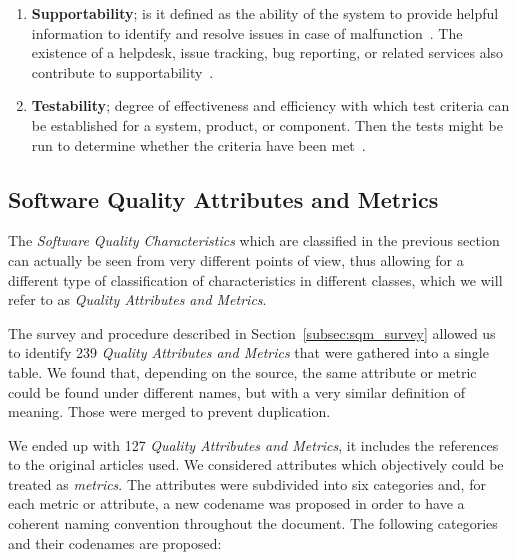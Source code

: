 \begin{enumerate}
    \item \textbf{Supportability}; is it defined as the ability of the system to provide helpful information  to identify and resolve issues in case of malfunction~\cite{microsoft_2010}. The existence of a helpdesk, issue tracking, bug reporting, or related services also contribute to supportability~\cite{orviz_fernandez_eosc-synergy_2020}.

    \item \textbf{Testability}; degree of effectiveness and efficiency with which test criteria can be established for a system, product, or component. Then the tests might be run to determine whether the criteria have been met~\cite{iso_25010_2011_2017}.
\end{enumerate}

\subsection{Software Quality Attributes and Metrics}
\label{subsec:SW_quality_attributes}

The \textit{Software Quality Characteristics} which are classified in the previous section can actually be seen from very different points of view, thus allowing for a different type of classification of characteristics in different classes, which we will refer to as \textit{Quality Attributes and Metrics}.

The survey and procedure described in Section~\ref{subsec:sqm_survey} allowed us to identify 239 \textit{Quality Attributes and Metrics} that were gathered into a single table. We found that, depending on the source, the same attribute or metric could be found under different names, but with a very similar definition of meaning. Those were merged to prevent duplication.

We ended up with 127 \textit{Quality Attributes and Metrics}, it includes the references to the original articles used. We considered attributes which objectively could be treated as \textit{metrics}. The attributes were subdivided into six categories and, for each metric or attribute, a new codename was proposed in order to have a coherent naming convention throughout the document. The following categories and their codenames are proposed:

